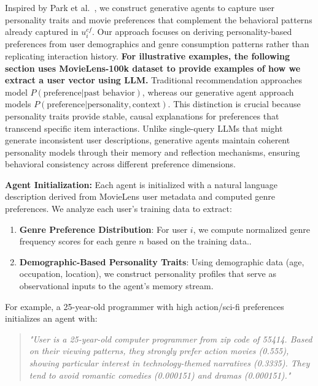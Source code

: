 \documentclass[acmsmall]{acmart}
\begin{document}
Inspired by Park et al.~\cite{park2023generative}, we construct generative agents to capture user personality traits and movie preferences that complement the behavioral patterns already captured in $u^{cf}_i$. Our approach focuses on deriving personality-based preferences from user demographics and genre consumption patterns rather than replicating interaction history. \textbf{For illustrative examples, the following section uses MovieLens-100k dataset to provide examples of how we extract a user vector using LLM.} Traditional recommendation approaches model $P(\text{preference} | \text{past behavior})$, whereas our generative agent approach models $P(\text{preference} | \text{personality}, \text{context})$. This distinction is crucial because personality traits provide stable, causal explanations for preferences that transcend specific item interactions. Unlike single-query LLMs that might generate inconsistent user descriptions, generative agents maintain coherent personality models through their memory and reflection mechanisms, ensuring behavioral consistency across different preference dimensions.

\textbf{Agent Initialization:} Each agent is initialized with a natural language description derived from MovieLens user metadata and computed genre preferences. We analyze each user's training data to extract:

\begin{enumerate}
    \item \textbf{Genre Preference Distribution}: For user $i$, we compute normalized genre frequency scores for each genre $n$ based on the training data..
    
    \item \textbf{Demographic-Based Personality Traits}: Using demographic data (age, occupation, location), we construct personality profiles that serve as observational inputs to the agent's memory stream.
\end{enumerate}

For example, a 25-year-old programmer with high action/sci-fi preferences initializes an agent with:
\begin{quote}
\textit{"User is a 25-year-old computer programmer from zip code of 55414. Based on their viewing patterns, they strongly prefer action movies (0.555), showing particular interest in technology-themed narratives (0.3335). They tend to avoid romantic comedies (0.000151) and dramas (0.000151)."}
\end{quote}
\end{document}
